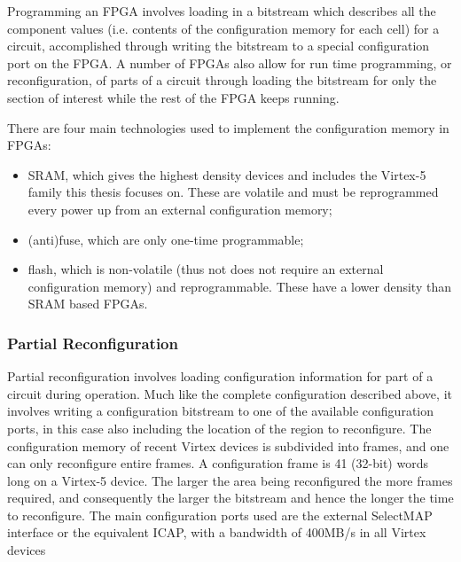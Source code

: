 \documentclass[12pt,final,oneside]{dwThesis} %
\begin{document}
   Programming an \gls{FPGA} involves loading in a bitstream which describes
   all the component values (i.e. contents of the configuration memory for each
   cell) for a circuit, accomplished through writing the bitstream to a special
   configuration port on the \gls{FPGA}. A number of \glspl{FPGA} also allow
   for run time programming, or reconfiguration, of parts of a circuit through
   loading the bitstream for only the section of interest while the rest of the
   \gls{FPGA} keeps running.

    There are four main
   technologies used to implement the configuration memory in \glspl{FPGA}:

   \begin{itemize}

      \item \gls{SRAM}, which gives the highest density devices and includes
         the Virtex-5 family this thesis focuses on. These are volatile and
         must be reprogrammed every power up from an external configuration
         memory;
      \item (anti)fuse, which are only one-time programmable;
      \item flash, which is non-volatile (thus not does not require an external
         configuration memory) and reprogrammable. These have a lower
         density than \gls{SRAM} based \glspl{FPGA}\cite{FPGAArch}.

   \end{itemize}
   \subsubsection{Partial Reconfiguration} Partial
   reconfiguration involves loading configuration information for part of a
   circuit during operation. Much like the complete configuration described
   above, it involves writing a configuration bitstream to one of the
   available configuration ports, in this case also including the location
   of the region to reconfigure. The configuration memory of recent Virtex
   devices is subdivided into frames, and one can only reconfigure entire
   frames. A configuration frame is 41 (32-bit) words long on a Virtex-5
   device. The larger the area being reconfigured the more frames required,
   and consequently the larger the bitstream and hence the longer the time
   to reconfigure. The main configuration ports used are the external
   SelectMAP interface or the equivalent \gls{ICAP}, with a bandwidth of
   400MB/s in all Virtex devices \cite{XCell33,DiesselChange}
\end{document}
